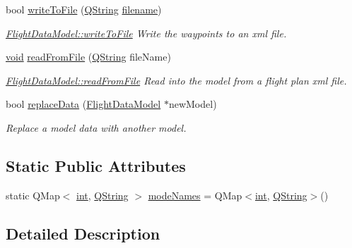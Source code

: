 \begin{DoxyCompactItemize}
bool \hyperlink{group___path_gae8b76411094a9ad3164eab0996436da6}{write\-To\-File} (\hyperlink{group___u_a_v_objects_plugin_gab9d252f49c333c94a72f97ce3105a32d}{Q\-String} \hyperlink{ioapi_8h_a7a03a664b090ce5c848ecb31cb4a2fa8}{filename})
\begin{DoxyCompactList}\small\item\em \hyperlink{group___path_gae8b76411094a9ad3164eab0996436da6}{Flight\-Data\-Model\-::write\-To\-File} Write the waypoints to an xml file. \end{DoxyCompactList}\item 
\hyperlink{group___u_a_v_objects_plugin_ga444cf2ff3f0ecbe028adce838d373f5c}{void} \hyperlink{group___path_ga39997b5fd9d9720f2798e2c1a18b8171}{read\-From\-File} (\hyperlink{group___u_a_v_objects_plugin_gab9d252f49c333c94a72f97ce3105a32d}{Q\-String} file\-Name)
\begin{DoxyCompactList}\small\item\em \hyperlink{group___path_ga39997b5fd9d9720f2798e2c1a18b8171}{Flight\-Data\-Model\-::read\-From\-File} Read into the model from a flight plan xml file. \end{DoxyCompactList}\item 
bool \hyperlink{group___path_ga59cab53123301865b4604e97e13e1ce0}{replace\-Data} (\hyperlink{class_flight_data_model}{Flight\-Data\-Model} $\ast$new\-Model)
\begin{DoxyCompactList}\small\item\em Replace a model data with another model. \end{DoxyCompactList}\end{DoxyCompactItemize}
\subsection*{Static Public Attributes}
\begin{DoxyCompactItemize}
\item 
static Q\-Map$<$ \hyperlink{ioapi_8h_a787fa3cf048117ba7123753c1e74fcd6}{int}, \hyperlink{group___u_a_v_objects_plugin_gab9d252f49c333c94a72f97ce3105a32d}{Q\-String} $>$ \hyperlink{group___path_gae4137f8c1c8d4c53cea911761c13b182}{mode\-Names} = Q\-Map$<$\hyperlink{ioapi_8h_a787fa3cf048117ba7123753c1e74fcd6}{int}, \hyperlink{group___u_a_v_objects_plugin_gab9d252f49c333c94a72f97ce3105a32d}{Q\-String}$>$()
\end{DoxyCompactItemize}


\subsection{Detailed Description}


